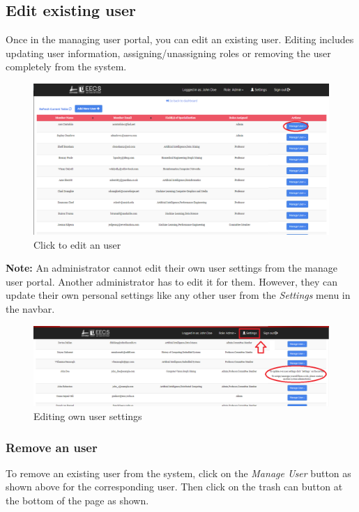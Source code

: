 \documentclass[fontsize=12pt,paper=letter,twoside]{scrartcl}
\begin{document}
\clearpage
\subsection{Edit existing user}
Once in the managing user portal, you can edit an existing user. Editing includes updating user information, assigning/unassigning roles or removing the user completely from the system.

\begin{figure}[!htb]
\begin{center}
\includegraphics[width=.99\textwidth]{images/mu/edit_user.png}
\end{center}
\caption{Click to edit an user}
\label{fig:edit_user}
\end{figure}

\smallskip
\noindent \textbf{Note:} An administrator cannot edit their own user settings from the manage user portal. Another administrator has to edit it for them. However, they can update their own personal settings like any other user from the \emph{Settings} menu in the navbar. 

\begin{figure}[!htb]
\begin{center}
\includegraphics[width=.99\textwidth]{images/mu/edit_own_user.png}
\end{center}
\caption{Editing own user settings}
\label{fig:edit_own_user}
\end{figure}

\clearpage
\subsubsection{Remove an user}
To remove an existing user from the system, click on the \emph{Manage User} button as shown above for the corresponding user. Then click on the trash can button at the bottom of the page as shown.
\end{document}
